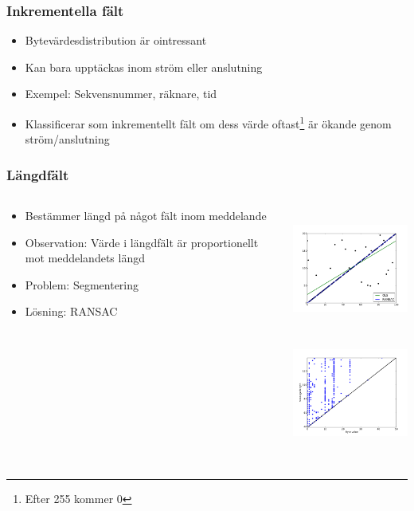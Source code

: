 \documentclass[xetex]{beamer}
\begin{document}
    \begin{frame}
        \frametitle{Inkrementella fält}
        \begin{itemize}
            \item Bytevärdesdistribution är ointressant
            \item Kan bara upptäckas inom ström eller anslutning
            \item Exempel: Sekvensnummer, räknare, tid
            \item Klassificerar som inkrementellt fält om dess värde
                oftast\footnote{Efter 255 kommer 0} är ökande genom
                ström/anslutning
        \end{itemize}
    \end{frame}
    \begin{frame}
        \frametitle{Längdfält}
        \begin{columns}[t]
            \begin{column}[T]{6cm}
                \begin{itemize}
                    \item Bestämmer längd på något fält inom meddelande
                    \item Observation: Värde i längdfält är proportionellt
                        mot meddelandets längd
                    \item Problem: Segmentering
                    \item Lösning: RANSAC
                \end{itemize}
            \end{column}
            \begin{column}[T]{6cm}
                \includegraphics[height=4cm]{img/ransac.pdf}\\
                \includegraphics[height=4cm]{img/length.pdf}
            \end{column}
        \end{columns}
    \end{frame}
\end{document}
